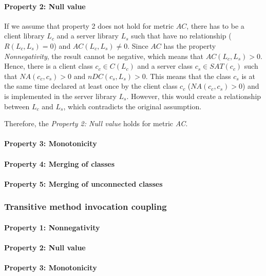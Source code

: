 \paragraph{Property 2: Null value}
If we assume that property 2 does not hold for metric $AC$, there has to be a client library $L_c$ and a server library $L_s$ such that have no relationship ($R(L_c, L_s) = 0$) and $AC(L_c, L_s)	\neq 0$. Since $AC$ has the property \textit{Nonnegativity}, the result cannot be negative, which means that $AC(L_c, L_s) > 0$. Hence, there is a client class $c_c \in C(L_c)$ and a server class $c_s \in SAT(c_c)$ such that $NA(c_c, c_s) > 0$ and $nDC(c_s, L_s) > 0$. This means that the class $c_s$ is at the same time declared at least once by the client class $c_c$ ($NA(c_c, c_s) > 0$) and is implemented in the server library $L_s$. However, this would create a relationship between $L_c$ and $L_s$, which contradicts the original assumption.

 Therefore, the \textit{Property 2: Null value} holds for metric \textit{AC}.

\paragraph{Property 3: Monotonicity}

\paragraph{Property 4: Merging of classes}

\paragraph{Property 5: Merging of unconnected classes}

\subsubsection{Transitive method invocation coupling}
\paragraph{Property 1: Nonnegativity}

\paragraph{Property 2: Null value}

\paragraph{Property 3: Monotonicity}

